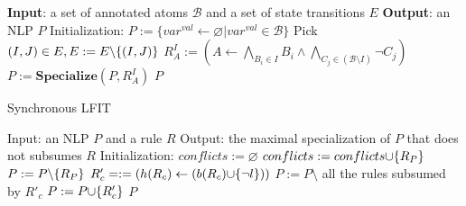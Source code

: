 \begin{algorithm}[ht]
\begin{algorithmic}
    \State \textbf{Input}: a set of annotated atoms $\mathcal{B}$ and a set of state transitions $E$
    \State \textbf{Output}: an NLP $P$
    \State Initialization: $P:= \{var^{val}\gets\varnothing|var^{val}\in \mathcal{B}\}$
        \State Pick $(I,J)\in E,E:= E \miset{(I,J)}$
            \State $R_A^I:= (A\gets\underset{B_i\in I}{\bigwedge}B_i\land \underset{C_j\in (\mathcal{B}\setminus I)}{\bigwedge}\lnot C_j)$
            \State $P:= \mathbf{Specialize}(P,R_A^I)$
        \EndFor
    \EndWhile
    \State\Return $P$
\end{algorithmic}
\caption{Synchronous LFIT}\label{alg:syncLFIT}
\end{algorithm}

\begin{algorithm}[ht]
\begin{algorithmic}
    \State Input: an NLP $P$ and a rule $R$
    \State Output: the maximal specialization of $P$ that does not subsumes $R$
    \State Initialization: $conflicts := \varnothing$
    \State{\textcolor{gray}{// Search rules that need to be specialized}}
            \State $conflicts := conflicts\addset{R_P}$
            \State $P := P \miset{R_P} $
        \EndIf
    \EndFor
    \State{\textcolor{gray}{// Revise the rules by least specialization}}
                \State $R'_c=:= (h(R_c) \gets (b(R_c) \addset{\lnot l}))$
                    \State $P := P \setminus$ all the rules subsumed by $R'_c$
                    \State $P := P \addset{ R'_c}$
                \EndIf
            \EndIf
        \EndFor
    \EndFor
    \State\Return $P$
\end{algorithmic}
\caption{\textbf{Specialize} in synchronous LFIT algorithm%
}\label{alg:specializeLFIT}
\end{algorithm}


